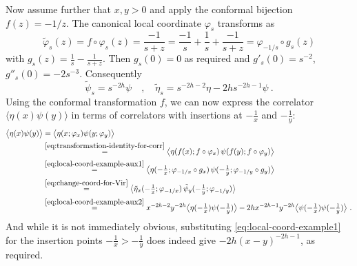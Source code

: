\documentclass[11pt,a4paper]{article}
\numberwithin{equation}{section}
\begin{document}
Now assume further that $x,y>0$ and apply the conformal bijection $f(z) = -1/z$. 
The canonical local coordinate $\varphi_s$ transforms as
\begin{equation}\label{eq:local-coord-example-aux1}
	\tilde\varphi_s(z) = f \circ \varphi_s(z) = \frac{-1}{s+z}
	= \frac{-1}{s} + \frac{1}{s} + \frac{-1}{s+z}
	= \varphi_{-1/s} \circ g_s(z)
\end{equation}
with $g_s(z) = \frac{1}{s} - \frac{1}{s+z}$. Then $g_s(0)=0$ as required and $g'_s(0) = s^{-2}$, $g''_s(0) = -2s^{-3}$.
Consequently
\begin{equation}\label{eq:local-coord-example-aux2}
	\tilde\psi_s = s^{-2h} \psi
\quad , \quad
	\tilde\eta_s = s^{-2h-2} \eta - 2 h s^{-2h-1} \psi~.
\end{equation}
Using the conformal transformation $f$, we can now express the correlator $\langle  \eta(x) \psi(y) \rangle$ in terms of correlators with insertions at $-\frac1x$ and $-\frac1y$:
\begin{align}
\big\langle  \eta(x) \psi(y) \big\rangle 
&= 
\big\langle  \eta(x;\varphi_x) \psi(y;\varphi_y) \big\rangle 
\nonumber\\	
&\overset{\eqref{eq:transformation-identity-for-corr}}{=}
\big\langle  \eta(f(x);f \circ \varphi_x) \, \psi(f(y);f \circ \varphi_y) \big\rangle 
\nonumber\\	
&\overset{\eqref{eq:local-coord-example-aux1}}{=} 
\big\langle  \eta(-\tfrac1x;\varphi_{-1/x} \circ g_x) \, \psi(-\tfrac1y;\varphi_{-1/y} \circ g_y) 
\big\rangle 
\nonumber\\	
&\overset{\eqref{eq:change-coord-for-Vir}}{=} 
\big\langle  \tilde\eta_x(-\tfrac1x;\varphi_{-1/x}) \, \tilde\psi_y(-\tfrac1y;\varphi_{-1/y}) \big\rangle 
\nonumber\\	
&\overset{\eqref{eq:local-coord-example-aux2}}{=}  
x^{-2h-2} y^{-2h} \big\langle \eta(-\tfrac1x) \psi(-\tfrac1y) \big\rangle 
-2h x^{-2h-1}
y^{-2h} \big\langle \psi(-\tfrac1x) \psi(-\tfrac1y) \big\rangle  ~.
\end{align}
And while it is not immediately obvious, substituting \eqref{eq:local-coord-example1} for the insertion points $-\frac1x>-\frac1y$ does indeed give $-2h(x-y)^{-2h-1}$, as required.

{\small

}
\end{document}
